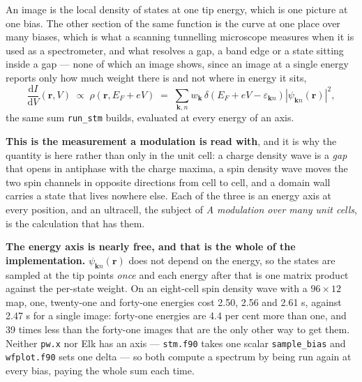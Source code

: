 \documentclass[11pt,a4paper]{article}
\newcommand{\code}[1]{\texttt{\small #1}}
\begin{document}
An image is the local density of states at one tip energy, which is one picture
at one bias. The other section of the same function is the curve at one place
over many biases, which is what a scanning tunnelling microscope measures when
it is used as a spectrometer, and what resolves a gap, a band edge or a state
sitting inside a gap --- none of which an image shows, since an image at a single
energy reports only how much weight there is and not where in energy it sits,
\begin{equation*}
  \frac{\mathrm{d}I}{\mathrm{d}V}(\mathbf r, V) \;\propto\;
  \rho(\mathbf r, E_F + eV) \;=\;
  \sum_{\mathbf k, n} w_{\mathbf k}\,
     \delta\!\left(E_F + eV - \varepsilon_{\mathbf k n}\right)
     \left|\psi_{\mathbf k n}(\mathbf r)\right|^2 ,
\end{equation*}
the same sum \code{run\_stm} builds, evaluated at every energy of an axis.

\textbf{This is the measurement a modulation is read with}, and it is why the
quantity is here rather than only in the unit cell: a charge density wave is a
\emph{gap} that opens in antiphase with the charge maxima, a spin density wave
moves the two spin channels in opposite directions from cell to cell, and a
domain wall carries a state that lives nowhere else. Each of the three is an
energy axis at every position, and an ultracell, the subject of \emph{A
modulation over many unit cells}, is the calculation that has them.

\textbf{The energy axis is nearly free, and that is the whole of the
implementation.} $\psi_{\mathbf k n}(\mathbf r)$ does not depend on the energy,
so the states are sampled at the tip points \emph{once} and each energy after
that is one matrix product against the per-state weight. On an eight-cell spin
density wave with a $96\times12$ map, one, twenty-one and forty-one energies cost
2.50, 2.56 and 2.61 s, against 2.47 s for a single image: forty-one energies are
4.4 per cent more than one, and 39 times less than the forty-one images that are
the only other way to get them. Neither \code{pw.x} nor Elk has an axis ---
\code{stm.f90} takes one scalar \code{sample\_bias} and \code{wfplot.f90} sets
one delta --- so both compute a spectrum by being run again at every bias, paying
the whole sum each time.
\end{document}
